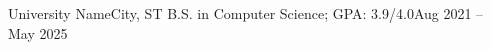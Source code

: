 \resumeSubHeadingListStart
  \resumeSubheading
    {University Name}{City, ST}
    {B.S. in Computer Science; GPA: 3.9/4.0}{Aug 2021 -- May 2025}
\resumeSubHeadingListEnd